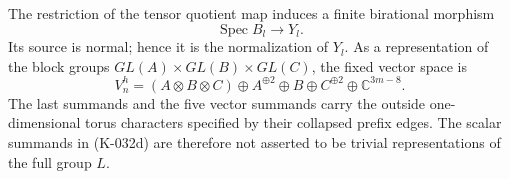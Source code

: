 \begin{theorem}[K-032, normalization]
The restriction of the tensor quotient map induces a finite birational
morphism
\[
                 \operatorname{Spec}B_l\longrightarrow Y_l.
                                                        \tag{K-032c}
\]
Its source is normal; hence it is the normalization of $Y_l$.
As a representation of the block groups $GL(A)\times GL(B)\times GL(C)$,
the fixed vector space is
\[
 V_n^h=(A\otimes B\otimes C)\oplus A^{\oplus2}\oplus B
                  \oplus C^{\oplus2}\oplus\mathbb C^{3m-8}.
                                                        \tag{K-032d}
\]
The last summands and the five vector summands carry the outside
one-dimensional torus characters specified by their collapsed prefix
edges.  The scalar summands in (K-032d) are therefore not asserted to
be trivial representations of the full group $L$.
\end{theorem}

